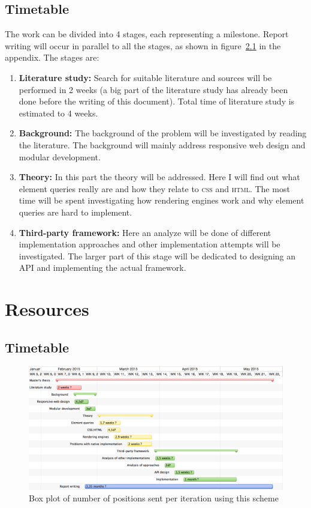 \documentclass[oneside,a4paper,11pt]{kth-mag}
\begin{document}
\section{Timetable}
The work can be divided into 4 stages, each representing a milestone. Report writing will occur in parallel to all the stages, as shown in figure~\ref{fig:timetable} in the appendix. The stages are:
\begin{enumerate}
\item \textbf{Literature study:} Search for suitable literature and sources will be performed in 2 weeks (a big part of the literature study has already been done before the writing of this document). Total time of literature study is estimated to 4 weeks.
\item \textbf{Background:} The background of the problem will be investigated by reading the literature. The background will mainly address responsive web design and modular development.
\item \textbf{Theory:} In this part the theory will be addressed. Here I will find out what element queries really are and how they relate to \textsc{css} and \textsc{html}. The most time will be spent investigating how rendering engines work and why element queries are hard to implement.
\item \textbf{Third-party framework:} Here an analyze will be done of different implementation approaches and other implementation attempts will be investigated. The larger part of this stage will be dedicated to designing an API and implementing the actual framework.
\end{enumerate}

\appendix
\addappheadtotoc
\chapter{Resources}
\section{Timetable}

\clearpage
\newpage

\begin{figure}
\centering
\includegraphics{timetable}
\caption{Box plot of number of positions sent per iteration using this scheme}
\label{fig:timetable}
\end{figure}
\restoregeometry
\end{document}

